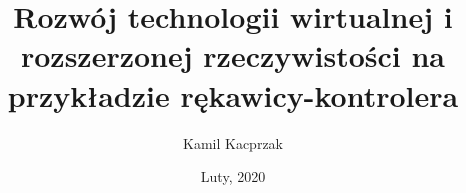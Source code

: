 \documentclass[inf, h]{pjatkThesis}
\author{Kamil Kacprzak}
\title{Rozwój technologii wirtualnej i rozszerzonej rzeczywistości na przykładzie rękawicy-kontrolera}
\date{Luty, 2020}
\begin{document}
\tableofcontents
\listoffigures


\cite{Tomaszewski2000}
\baselineskip=22pt




%



    
\end{document}
